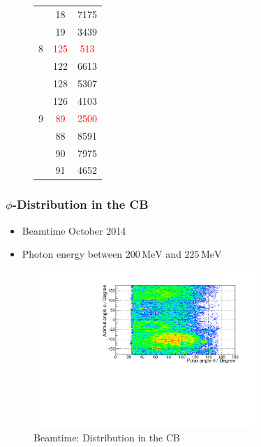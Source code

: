 \documentclass[slidestop,compress,mathserif]{beamer}
\begin{document}
\begin{frame}
\begin{figure}
\begin{minipage}[t]{.4\textwidth}
{\begin{tabular}{lcc}
				& 18& 7175 \\
				
				& 19& 3439 \\
				
				\hline
				
				8 & \textcolor{red}{125} &\textcolor{red}{513} \\
				
				
				& 122& 6613\\
				
				& 128 & 5307 \\
				
				& 126 & 4103 \\
				
				\hline
				
				9 & \textcolor{red}{89}& \textcolor{red}{2500}\\
				
				& 88& 8591\\
				
				&90&7975 \\
				
				&91&4652 \\
				
				
				
			\end{tabular}
		}	
		\end{minipage}
	\end{figure}
\end{frame}

\begin{frame}
	\frametitle{$\phi$-Distribution in the CB}
	\begin{itemize}
		\item Beamtime October 2014
		\item Photon energy between $200\,\text{MeV}$ and $225\,\text{MeV}$
	\end{itemize}
	\begin{figure}
		\includegraphics[width=0.75\textwidth]{Pictures/20172404ThetaPhi200MeVBeam}
		\caption{Beamtime: Distribution in the CB}
	\end{figure}
\end{frame}
\end{document}
